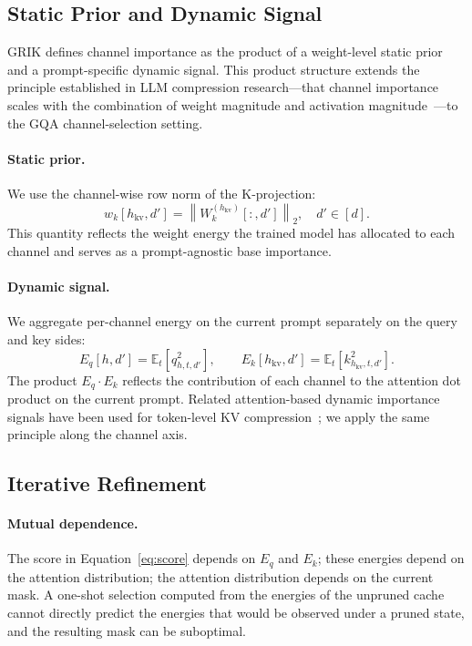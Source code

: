 \documentclass{article}
\begin{document}
\subsection{Static Prior and Dynamic Signal}
\label{app:score-terms}
 
GRIK defines channel importance as the product of a weight-level static prior and a prompt-specific dynamic signal. This product structure extends the principle established in LLM compression research---that channel importance scales with the combination of weight magnitude and activation magnitude~\citep{wanda, awq}---to the GQA channel-selection setting.
 
\paragraph{Static prior.} We use the channel-wise row norm of the K-projection:
\begin{equation}
w_k[h_{\mathrm{kv}}, d'] = \left\| W_k^{(h_{\mathrm{kv}})}[:, d'] \right\|_2, \quad d' \in [d].
\label{eq:static}
\end{equation}
This quantity reflects the weight energy the trained model has allocated to each channel and serves as a prompt-agnostic base importance.
 
\paragraph{Dynamic signal.} We aggregate per-channel energy on the current prompt separately on the query and key sides:
\begin{equation}
E_q[h, d'] = \mathbb{E}_t \left[ q_{h, t, d'}^2 \right], \qquad
E_k[h_{\mathrm{kv}}, d'] = \mathbb{E}_t \left[ k_{h_{\mathrm{kv}}, t, d'}^2 \right].
\label{eq:dynamic}
\end{equation}
The product $E_q \cdot E_k$ reflects the contribution of each channel to the attention dot product on the current prompt. Related attention-based dynamic importance signals have been used for token-level KV compression~\citep{h2o, snapkv, think}; we apply the same principle along the channel axis.
 
\subsection{Iterative Refinement}
\label{app:iterative}
 
\paragraph{Mutual dependence.} The score in Equation~\ref{eq:score} depends on $E_q$ and $E_k$; these energies depend on the attention distribution; the attention distribution depends on the current mask. A one-shot selection computed from the energies of the unpruned cache cannot directly predict the energies that would be observed under a pruned state, and the resulting mask can be suboptimal.
 
\end{document}
